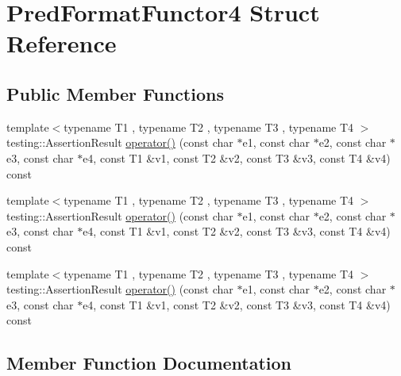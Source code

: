 \hypertarget{struct_pred_format_functor4}{}\section{Pred\+Format\+Functor4 Struct Reference}
\label{struct_pred_format_functor4}
\subsection*{Public Member Functions}
\begin{DoxyCompactItemize}
\item 
{\footnotesize template$<$typename T1 , typename T2 , typename T3 , typename T4 $>$ }\\testing\+::\+Assertion\+Result \mbox{\hyperlink{struct_pred_format_functor4_a97061d2b9eadf357f4e50a75f5a9af5b}{operator()}} (const char $\ast$e1, const char $\ast$e2, const char $\ast$e3, const char $\ast$e4, const T1 \&v1, const T2 \&v2, const T3 \&v3, const T4 \&v4) const
\item 
{\footnotesize template$<$typename T1 , typename T2 , typename T3 , typename T4 $>$ }\\testing\+::\+Assertion\+Result \mbox{\hyperlink{struct_pred_format_functor4_a97061d2b9eadf357f4e50a75f5a9af5b}{operator()}} (const char $\ast$e1, const char $\ast$e2, const char $\ast$e3, const char $\ast$e4, const T1 \&v1, const T2 \&v2, const T3 \&v3, const T4 \&v4) const
\item 
{\footnotesize template$<$typename T1 , typename T2 , typename T3 , typename T4 $>$ }\\testing\+::\+Assertion\+Result \mbox{\hyperlink{struct_pred_format_functor4_a97061d2b9eadf357f4e50a75f5a9af5b}{operator()}} (const char $\ast$e1, const char $\ast$e2, const char $\ast$e3, const char $\ast$e4, const T1 \&v1, const T2 \&v2, const T3 \&v3, const T4 \&v4) const
\end{DoxyCompactItemize}


\subsection{Member Function Documentation}
\mbox{\label{struct_pred_format_functor4_a97061d2b9eadf357f4e50a75f5a9af5b}} 
